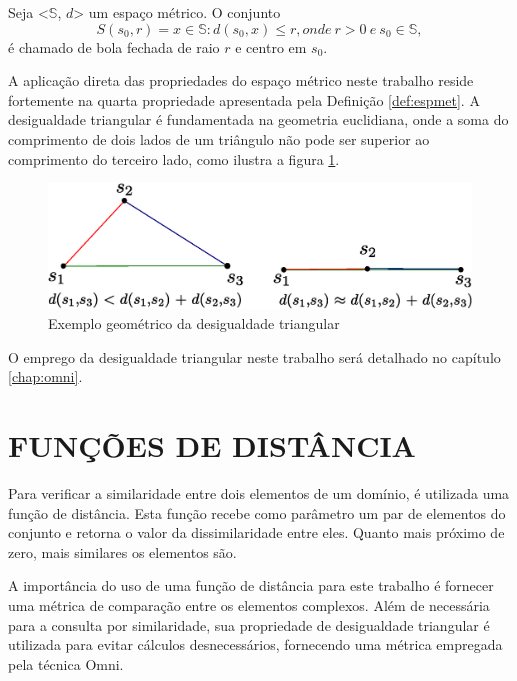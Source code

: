 \begin{mydef}
 \label{def:bola}
 Seja <$\mathbb{S}$, $d$> um espaço métrico. O conjunto
 \begin{equation}
  S(s_0,r) = {x \in \mathbb{S} : d(s_0, x) \leq r},	onde\ r > 0\ e\ s_0 \in \mathbb{S},
 \end{equation}
  é chamado de bola fechada de raio $r$ e centro em $s_0$. 
\end{mydef}

A aplicação direta das propriedades do espaço métrico neste trabalho reside fortemente na quarta propriedade apresentada pela Definição \ref{def:espmet}. A desigualdade triangular é fundamentada na geometria euclidiana, 
onde a soma do comprimento de dois lados de um triângulo não pode ser superior ao comprimento do terceiro lado, como ilustra a figura \ref{fig:destri}.

\begin{figure}[H]
\centering
\includegraphics[width=.8\textwidth]{dados/figuras/desig_tri.eps}
\caption{Exemplo geométrico da desigualdade triangular}
\label{fig:destri}
\end{figure}

O emprego da desigualdade triangular neste trabalho será detalhado no capítulo \ref{chap:omni}.

\section{FUNÇÕES DE DISTÂNCIA}
\label{sec:funcdist}
Para verificar a similaridade entre dois elementos de um domínio, é utilizada uma função de distância. Esta função recebe como parâmetro um par
de elementos do conjunto e retorna o valor da dissimilaridade entre eles. Quanto mais próximo de zero, mais similares os elementos são.\par

A importância do uso de uma função de distância para este trabalho é fornecer uma métrica de comparação entre os elementos complexos. Além de
necessária para a consulta por similaridade, sua propriedade de desigualdade triangular é utilizada para evitar cálculos desnecessários, fornecendo uma métrica
empregada pela técnica Omni.\par
